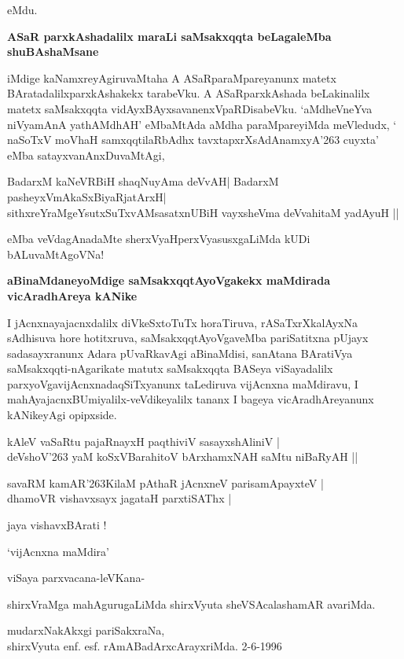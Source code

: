 \noindent
eMdu. 

{\bigskip
\noindent
{\large\bf ASaR parxkAshadalilx maraLi saMsakxqqta beLagaleMba shuBAshaMsane}}\label{page92}
\medskip


iMdige kaNamxreyAgiruvaMtaha A ASaRparaMpareyanunx matetx BAratadalilx\break parxkAshakekx tarabeVku. A ASaR\-parxkAshada beLakinalilx matetx saMsakxqqta vidAyxBAyxsa\-vanenxVpaRDisabeVku. `aMdheVneYva niVyamAnA yathAM\-dhAH\label{63}' eMbaMtAda aMdha paraMpareyiMda meVledudx, ` naSoTxV moVhaH samxqqtilaRbAdhx\label{63} tavxtapxrXsAdAnamxyA\char'263 \-cuyxta' eMba satayxvanAnxDuvaMtAgi,

\begin{shloka}
BadarxM kaNeVRBiH shaqNuyAma deVvAH| BadarxM pasheyxVmAkaSxBiyaRjatArxH|\\\label{63}
sithxreYraMgeYsutxSuTxvAMsasatxnUBiH vayxsheVma deVvahitaM yadAyuH ||
\end{shloka}

\noindent
eMba veVdagAnadaMte sherxVyaHperxVyasusxgaLiMda kUDi bALuvaMtAgoVNa!

{\bigskip
\noindent
{\large\bf aBinaMdaneyoMdige saMsakxqqtAyoVgakekx maMdirada vicAradhAreya kANike}}\label{page63}
\medskip

\noindent
I jAcnxnayajacnxdalilx diVkeSxtoTuTx horaTiruva, rASaTxrXkalAyxNa sAdhisuva hore hotitx\-ruva, saMsakxqqtA\-yoVga\-veMba pariSatitxna pUjayx sadasayxranunx Adara pUvaRkavAgi aBinaMdisi, sanAtana BAratiVya saMsakxqqti\--nAgari\-kate matutx saMsakxqqta BASeya viSayadalilx parxyoVgavijAcnxnadaqSiTxyanunx taLediruva vijAcnxna maMdi\-ravu, I mahAyajacnxBUmiyalilx-veVdikeyalilx tananx I bageya vicAradhAreyanunx kANikeyAgi opipxside.

\begin{shloka}
kAleV vaSaRtu pajaRnayxH paqthiviV sasayxshAliniV |\\\label{63}
deVshoV\char'263 yaM koSxVBarahitoV bArxhamxNAH saMtu niBaRyAH ||
\end{shloka}

\begin{shloka}
savaRM kamAR\char'263KilaM pAthaR jAcnxneV parisamApayxteV |\\\label{63}
dhamoVR vishavxsayx jagataH parxtiSAThx |\label{63}
\end{shloka}

\begin{center}
jaya vishavxBArati !
\end{center}

\hfill `vijAcnxna maMdira'

\medskip
viSaya parxvacana-\hfill leVKana-

shirxVraMga mahAgurugaLiMda \hfill shirxVyuta sheVSAcalashamAR avariMda.

\medskip

\begin{center}
mudarxNakAkxgi pariSakxraNa,\\
shirxVyuta enf. esf. rAmABadArxcArayxriMda. 2-6-1996
\end{center}
